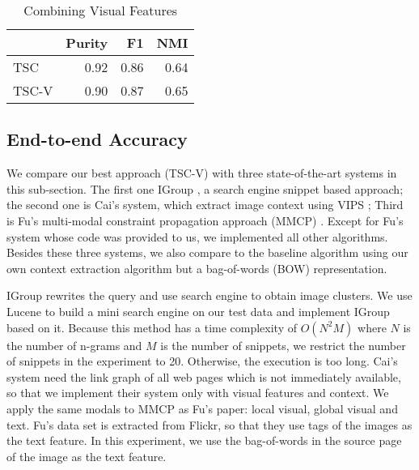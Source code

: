 \begin{table}[th]
\centering
\caption{Combining Visual Features}
\small
\begin{tabular}{|l|r|r|r|}
\hline
           &  {\bf Purity} &   {\bf F1} &   {\bf NMI} \\
\hline
 TSC &      0.92  &      0.86  &      0.64  \\
\hline
 TSC-V &      0.90  &      0.87  &      0.65 \\
\hline
\end{tabular}
\label{tab:visualeval}
\end{table}

\subsection{End-to-end Accuracy}
We compare our best approach (TSC-V) with three state-of-the-art systems
in this sub-section. The first one IGroup \cite{Jing2006},
a search engine snippet based approach;
the second one is Cai's \cite{Cai2004} system,
which extract image context using VIPS \cite{VIPS};
Third is Fu's multi-modal constraint propagation approach (MMCP) \cite{Fu2011}.
Except for Fu's system whose code was provided to us, we implemented
all other algorithms.
Besides these three systems, we also compare to the baseline algorithm using
our own context extraction algorithm but a bag-of-words (BOW) representation.

IGroup rewrites the query and use search engine to obtain image clusters. We use
Lucene to build a mini search engine on our test data and implement IGroup based on it.
Because this method has a time complexity of $O(N^2 M)$ where $N$ is
the number of n-grams and $M$ is the number of snippets, we restrict the number of
snippets in the experiment to 20. Otherwise, the execution is too long.
Cai's system need the link graph of all web pages which is not immediately available,
so that we implement their system only with visual features and context.
We apply the same modals to MMCP as Fu's paper: local visual, global visual
and text. Fu's data set is extracted from Flickr, so that they use tags of
the images as the text feature. In this experiment, we use the bag-of-words
in the source page of the image as the text feature.

